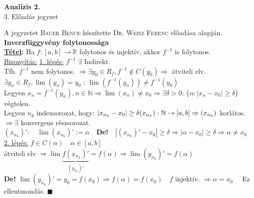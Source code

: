 \documentclass[a4paper,11pt]{article}
\begin{document}
\def\defi{\normalsize \textbf{Definíció: }}
\def\Z{\mathbb{Z}}
\def\Q{\mathbb{Q}}
\def\R{\mathbb{R}}
\def\N{\mathbb{N}}
\def\sume{\displaystyle\sum_{n=1}^{+\infty}}
\def\sumn{\displaystyle\sum_{n=0}^{+\infty}}
\def\biz{\normalsize{\underline{Bizonyítás:} }\hspace*{0.5cm}}
\def\tetel{\normalsize \textbf{\underline{Tétel}: }}
\def\limh{\displaystyle\lim_{h\to0}}
\def\narrow{\underset{n\rightarrow+\infty}{\longrightarrow}}
\def\limn{\displaystyle\lim_{n\to +\infty}}
\begin{center}
	{\LARGE\textbf{Analízis 2.}}\\[0.2cm]
	
	{\Large 3. Előadás jegyzet}\\[1cm]	
\end{center}
{\small A jegyzetet \textsc{Bauer Bence} készítette \textsc{Dr. Weisz Ferenc} előadása alapján.}\\[0.2cm]
\textbf{{\Large Inverzfüggyvény folytonossága}}\\[0.2cm]
\tetel Ha $f:[a,b]\to\R$ folytonos és injektív, akkor $f^{-1}$ is folytonos.\\[0.1cm]
\biz \underline{1. lépés:} $f^{-1}$  $\exists$ Indirekt.\\[0.1cm] Tfh. $f^{-1}$ nem folytonos. $\Rightarrow\exists y_{0}\in R_f, f^{-1}\notin C(y_0)\Rightarrow$ átviteli elv.\\[0.1cm] $\exists y_n\in R_f, \lim(y_n)=y_0$ : $\lim(f^{-1}(y_n)) \neq f^{-1}(y_0)$\\[0.1cm] Legyen $x_n=f^{-1}(y_n), n\in\N\Rightarrow\lim(x_n)\neq x_0\Rightarrow\exists\delta >0$: $\{n:|x_n-x_0|\geq\delta\}$ végtelen.\\[0.1cm] Legyen $n_k$ indexsorozat, hogy: $|x_{n_k}-x_0| \geq\delta\\[0.1cm](x_{n_k}):\N\to[a,b]\Rightarrow(x_{n_k})$ korlátos. $\Rightarrow\exists$ konvergens részsorozat.\\[0.1cm] $(x_{n_k})':\quad\lim (x_{n_k})':=\alpha\quad$\textbf{De!}$\quad|(x_{n_k})'-x_0|\geq\delta\Rightarrow|\alpha-x_0|\geq\delta\Rightarrow\alpha\neq x_0$\\[0.1cm]\underline{2. lépés:} $f\in C(\alpha)\quad\alpha\in[a,b]$\\[0.1cm] átviteli elv $\Rightarrow\lim\underbrace{f (x_{n_k})'}_{(y_{n_k})'}=f(\alpha)\Rightarrow \lim(y_{n_k})'=f(\alpha)$\\[0.1cm]\textbf{De!} $\lim(y_{n_k})'=y_0=f(x_0) \Rightarrow f(\alpha)=f(x_0)\quad f$ injektív. $\Rightarrow \alpha = x_0\quad$ Ez ellentmondás. $\blacksquare$\\[0.3cm]
\end{document}
